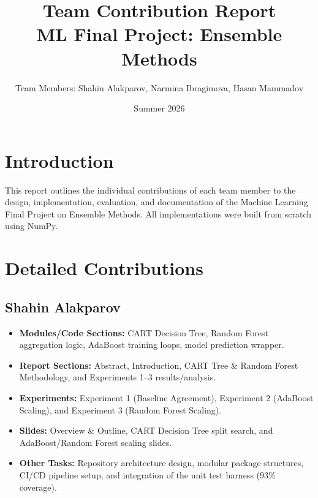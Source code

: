 \documentclass[11pt,a4paper]{article}
\title{Team Contribution Report \\ \large ML Final Project: Ensemble Methods}
\author{Team Members: Shahin Alakparov, Narmina Ibragimova, Hasan Mammadov}
\date{Summer 2026}
\begin{document}
\maketitle

\section{Introduction}
This report outlines the individual contributions of each team member to the design, implementation, evaluation, and documentation of the Machine Learning Final Project on Ensemble Methods. All implementations were built from scratch using NumPy.

\section{Detailed Contributions}

\subsection{Shahin Alakparov}
\begin{itemize}
    \item \textbf{Modules/Code Sections:} CART Decision Tree, Random Forest aggregation logic, AdaBoost training loops, model prediction wrapper.
    \item \textbf{Report Sections:} Abstract, Introduction, CART Tree \& Random Forest Methodology, and Experiments 1--3 results/analysis.
    \item \textbf{Experiments:} Experiment 1 (Baseline Agreement), Experiment 2 (AdaBoost Scaling), and Experiment 3 (Random Forest Scaling).
    \item \textbf{Slides:} Overview \& Outline, CART Decision Tree split search, and AdaBoost/Random Forest scaling slides.
    \item \textbf{Other Tasks:} Repository architecture design, modular package structures, CI/CD pipeline setup, and integration of the unit test harness (93\% coverage).
\end{itemize}
\end{document}
